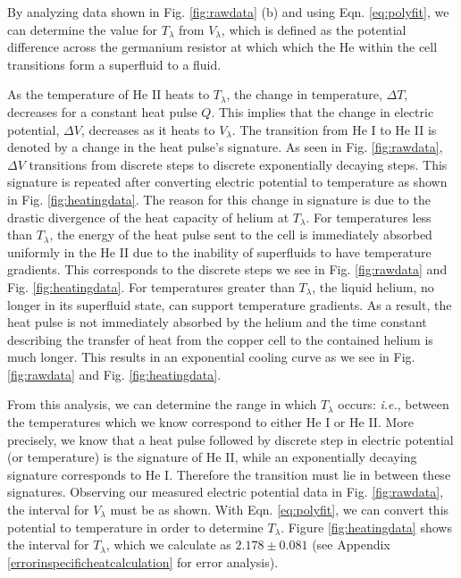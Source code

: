 By analyzing data shown in Fig. \ref{fig:rawdata} (b) and using Eqn. \ref{eq:polyfit}, we can determine the value for $T_{\lambda}$ from $V_{\lambda}$, which is defined as the potential difference across the germanium resistor at which which the He within the cell transitions form a superfluid to a fluid. 

As the temperature of He II heats to $T_{\lambda}$, the change in temperature, $\Delta T$, decreases for a constant heat pulse $Q$.  This implies that the change in electric potential, $\Delta V$, decreases as it heats to $V_{\lambda}$.  The transition from He I to He II is denoted by a change in the heat pulse's signature.  As seen in Fig. \ref{fig:rawdata}, $\Delta V$ transitions from discrete steps to discrete exponentially decaying steps.  This signature is repeated after converting electric potential to temperature as shown in Fig. \ref{fig:heatingdata}.  The reason for this change in signature is due to the drastic divergence of the heat capacity of helium at $T_{\lambda}$.  For temperatures less than $T_{\lambda}$, the energy of the heat pulse sent to the cell is immediately absorbed uniformly in the He II due to the inability of superfluids to have temperature gradients.  This corresponds to the discrete steps we see in Fig. \ref{fig:rawdata} and Fig. \ref{fig:heatingdata}.  For temperatures greater than $T_{\lambda}$, the liquid helium, no longer in its superfluid state, can support temperature gradients.  As a result, the heat pulse is not immediately absorbed by the helium and the time constant describing the transfer of heat from the copper cell to the contained helium is much longer. This results in an exponential cooling curve as we see in Fig. \ref{fig:rawdata} and Fig. \ref{fig:heatingdata}.  

From this analysis, we can determine the range in which $T_{\lambda}$ occurs: \emph{i.e.}, between the temperatures which we know correspond to either He I or He II.  More precisely, we know that a heat pulse followed by discrete step in electric potential (or temperature) is the signature of He II, while an exponentially decaying signature corresponds to He I. Therefore the transition must lie in between these signatures.  Observing our measured electric potential data in Fig. \ref{fig:rawdata}, the interval for $V_{\lambda}$ must be as shown.  With Eqn. \ref{eq:polyfit}, we can convert this potential to temperature in order to determine $T_{\lambda}$.  Figure \ref{fig:heatingdata} shows the interval for $T_{\lambda}$, which we calculate as $2.178\pm0.081$ (see Appendix \ref{errorinspecificheatcalculation} for error analysis). 

